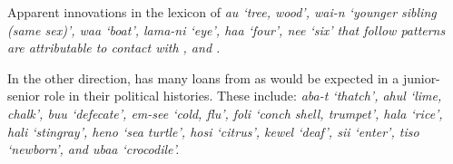 Apparent innovations in the lexicon of \it{au} ‘tree,
wood’, \it{wai-n} ‘younger sibling (same sex)’,
\it{waa} ‘boat’, \it{lama-ni} ‘eye’,
\it{haa} ‘four’, \it{nee} ‘six’ that follow  patterns
are attributable to contact with ,  and .

In the other direction,
 has many loans from  as would be expected in a junior-senior
role in their political histories.
These include: \it{aba-t} ‘thatch’,
\it{ahul} ‘lime, chalk’, \it{buu} ‘defecate’, \it{em-see} ‘cold,
flu’, \it{foli} ‘conch shell, trumpet’,
\it{hala} ‘rice’, \it{hali} ‘stingray’,
\it{heno} ‘sea turtle’, \it{hosi} ‘citrus’,
\it{kewel} ‘deaf’, \it{sii} ‘enter’,
\it{tiso} ‘newborn’, and \it{ubaa} ‘crocodile’.


